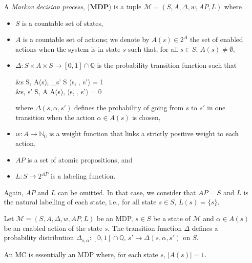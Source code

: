 \begin{definition}
	A \textit{Markov decision process}, (\textbf{MDP}) is a tuple $\mathcal{M}  = (S, A, \Delta, w, AP, L)$ where
	\begin{itemize}
		\item $S$ is a countable set of states,
		\item $A$ is a countable set of actions; we denote by $A(s) \in 2^A$  the set of enabled actions when the system is in state $s$ such that, for all $s \in S$,
    $A(s) \neq \emptyset$,
		\item $\Delta: S \times A \times S \rightarrow [0, 1] \cap \mathbb{Q}$ is the probability transition function such that
		\begin{flalign*}
			&\forall s \in S, \; \forall \alpha \in A(s), \; \sum_{s' \in S} \Delta(s, \alpha, s') = 1 \\
			 &\forall s, s' \in S, \; \forall \alpha \in A \setminus A(s), \; \Delta(s, \alpha, s') = 0
		\end{flalign*}

			where $\Delta(s, \alpha, s')$ defines the probability of going from $s$ to $s'$ in one transition when the action $\alpha \in A(s)$ is chosen,
    \item $w: A \rightarrow \mathbb{N}_0$ %
      is a weight function that links a strictly positive weight to each action,
    \item $AP$ is a set of atomic propositions, and
    \item $L: S \rightarrow 2^{AP}$ is a labeling function.
	\end{itemize}
\end{definition}
\begin{remark}
  Again, $AP$ and $L$ can be omitted. In that case, we consider that $AP=S$ and $L$ is the natural labelling of each state, i.e., for all state $s \in S$, $L(s) = \{s\}$.
\end{remark}

\begin{property}
  Let $\mathcal{M} = (S,A, \Delta, w, AP, L)$ be an MDP, $s \in S$ be a state of $\mathcal{M}$ and $\alpha \in A(s)$ be an enabled action of the state $s$. The transition function $\Delta$ defines a probability distribution $\Delta_{s, \alpha}: [0, 1]\cap \mathbb{Q}, \, s' \mapsto \Delta(s, \alpha, s')$ on $S$.
\end{property}
\begin{property}
  An MC is essentially an MDP where, for each state $s$, $|A(s)| = 1$.
\end{property}

